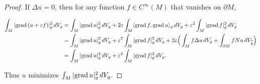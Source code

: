 \begin{proof}
If $\Delta u=0$, then for any function $f\in C^\infty(M)$ that vanishes on $\partial M$,
\begin{small}
\begin{align*}
\int_M|\mathrm{grad}\,(u+\varepsilon f)|^2_g\,dV_g&=\int_M|\mathrm{grad}\, u|^2_g\,dV_g+2\varepsilon\int_M\langle\mathrm{grad}\, f,\mathrm{grad}\, u\rangle_g\,dV_g+\varepsilon^2\int_M|\mathrm{grad}\, f|^2_g\,dV_g\\
&=\int_M|\mathrm{grad}\, u|^2_g\,dV_g+\varepsilon^2\int_M|\mathrm{grad}\, f|^2_g\,dV_g+2\varepsilon\Big(\int_Mf\Delta u\,dV_g+\int_{\partial M}fNu\,dV_{\widetilde{g}}\Big)\\
&=\int_M|\mathrm{grad}\, u|^2_g\,dV_g+\varepsilon^2\int_M|\mathrm{grad}\, f|^2_g\,dV_g.
\end{align*}
\end{small}
Thus $u$ minimizes $\int_M|\mathrm{grad}\, u|^2_g\,dV_g$.
\end{proof}
